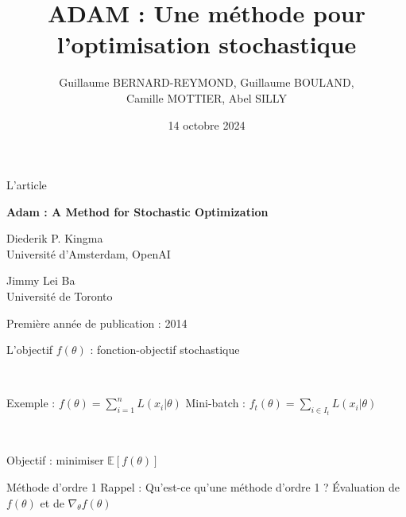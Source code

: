 \documentclass[11pt,aspectratio=169,xcolor=dvipsnames, french]{beamer}
\title{ADAM : Une méthode pour l'optimisation stochastique}
\author{Guillaume BERNARD-REYMOND, Guillaume BOULAND,\\ Camille MOTTIER, Abel SILLY}
\date{14 octobre 2024}
\begin{document}
\frame{\titlepage}

\begin{frame}{L'article}
\begin{center}
 \textbf{Adam : A Method for Stochastic Optimization}

\begin{multicols}{2}

 Diederik P. Kingma\\
 {\small Université d'Amsterdam, OpenAI}
 
 \columnbreak
 
 Jimmy Lei Ba\\
 {\small Université de Toronto}
\end{multicols}

Première année de publication : 2014
\end{center}

\end{frame}

\begin{frame}{L'objectif}
$f(\theta)$ : fonction-objectif stochastique 

\

Exemple : $f(\theta)=\displaystyle\sum_{i=1}^{n}L(x_i|\theta)$ \hspace{2cm}
Mini-batch : $f_t(\theta)=\displaystyle \sum_{i\in I_t}L(x_i|\theta)$

\

Objectif : minimiser $\mathbb E[f(\theta)]$
\end{frame}

\begin{frame}{Méthode d'ordre 1}
Rappel : Qu'est-ce qu'une méthode d'ordre 1 ? Évaluation de $f(\theta)$ et de $\nabla_{\theta}f(\theta)$

\begin{center}

\end{center}

\end{frame}
\end{document}
